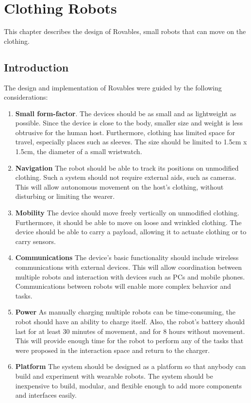 
\chapter{Clothing Robots}
This chapter describes the design of Rovables, small robots that can move on the clothing. 

\section{Introduction}
The design and implementation of Rovables were guided by the following  considerations: 
\begin{enumerate}
\item \textbf{Small form-factor}. The devices should be as small and as lightweight as possible. Since the device is close to the body, smaller size and weight is less obtrusive for the human host. Furthermore, clothing has limited space for travel, especially places such as sleeves. The size should be limited to 1.5cm x 1.5cm, the diameter of a small wristwatch.    

\item \textbf{Navigation}
The robot should be able to track its positions on unmodified clothing. Such a system should not require external aids, such as cameras. This will allow autonomous movement on the host's clothing, without disturbing or limiting the wearer.

\item \textbf{Mobility}
The device should move freely vertically on unmodified clothing. Furthermore, it should be able to move on loose and wrinkled clothing. The device should be able to carry a payload, allowing it to actuate clothing or to carry sensors. 

\item \textbf{Communications} 
The device's basic functionality should include wireless communications with external devices. This will allow coordination between multiple robots and interaction with devices such as PCs and mobile phones. Communications between robots will enable more complex behavior and tasks. 

\item \textbf{Power} 
As manually charging multiple robots can be time-consuming, the robot should have an ability to charge itself. Also, the robot's battery should last for at least 30 minutes of movement, and for 8 hours without movement. This will provide enough time for the robot to perform any of the tasks that were proposed in the interaction space and return to the charger.  

\item \textbf{Platform} 
The system should be designed as a platform so that anybody can build and experiment with wearable robots. The system should be inexpensive to build, modular, and flexible enough to add more components and interfaces easily.  

\end{enumerate}

